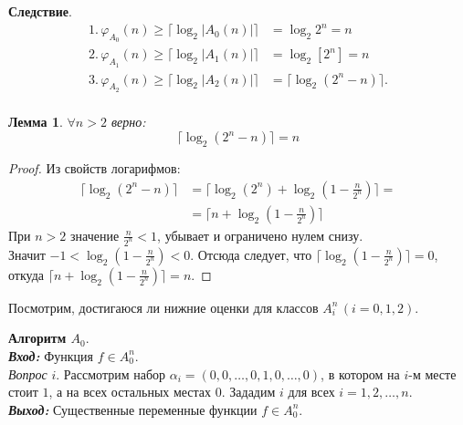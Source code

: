 \documentclass[oneside, final, 14pt]{extreport}
\newtheorem{lem}{Лемма}
\begin{document}
	\noindent\textbf{Следствие}. 
	\begin{displaymath}
		\begin{aligned}
			1.\, \varphi_{A_0}(n) \geq \lceil \log_2{|A_0(n)|} \rceil & = \log_2{2^n} = n  \\		
			2.\, \varphi_{A_1}(n) \geq \lceil \log_2{|A_1(n)|} \rceil & = \log_2[2^n] = n  \\
			3.\, \varphi_{A_2}(n) \geq \lceil \log_2{|A_2(n)|} \rceil & = \lceil \log_2(2^n - n) \rceil.  \\
		\end{aligned}
	\end{displaymath}
	
	\begin{lem}
		\label{log}
		$\forall n > 2$ верно:
		$$\lceil \log_2(2^n - n) \rceil = n$$
	\end{lem}
	\begin{proof}
		Из свойств логарифмов:
		\begin{displaymath}
		\begin{aligned}
		\lceil \log_2(2^n - n) \rceil & = \lceil \log_2(2^n) + \log_2(1 - \frac{n}{2^n}) \rceil =\\
												&= \lceil n + \log_2(1 - \frac{n}{2^n}) \rceil	
	    \end{aligned}
		\end{displaymath}
		При $n > 2$ значение  $\frac{n}{2^n} < 1$, убывает и ограничено нулем снизу. \\
		Значит  $ -1 < \log_2(1 - \frac{n}{2^n}) < 0$.
		Отсюда следует, что $\lceil \log_2(1 - \frac{n}{2^n})\rceil = 0 $, откуда $\lceil n + \log_2(1 - \frac{n}{2^n}) \rceil = n$.
	\end{proof} \par
	\bigskip
	\noindent Посмотрим, достигаюся ли нижние оценки для классов $A_i^n \, (i= 0,1,2)$. \par
	\bigskip
	
	\noindent\textbf{Алгоритм $A_0$}. \\
	 \emph{\textbf{Вход:}} Функция $f \in A_0^n$.\\
	 \emph{Вопрос} $i$. Рассмотрим набор $\alpha_i = (0, 0,  \ldots, 0, 1, 0, \ldots, 0)$, в котором на $i$-м месте стоит $1$, а на всех остальных местах $0$.
	 Зададим $i$ для всех $i = 1, 2, \ldots, n$. \\
	 \emph{\textbf{Выход:}} Существенные переменные функции $f \in A_0^n$.
	  
\end{document}
